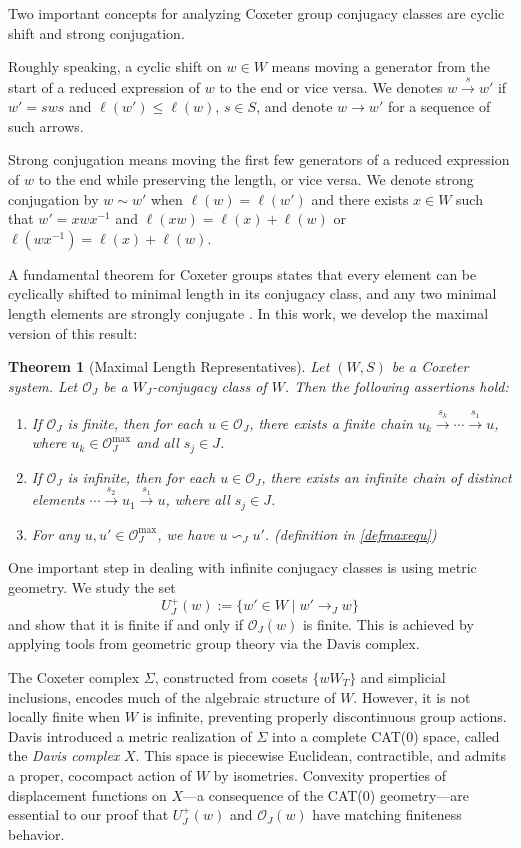 \documentclass[a4paper, reqno, 14pt]{amsart}
\def\co{\mathcal{O}}
\newtheorem{namedthm}{Theorem}
\newenvironment{thmA}[1]{%
  \renewcommand\thenamedthm{#1}%
  \begin{namedthm}
}{%
  \end{namedthm}
}
\theoremstyle{definition}
\theoremstyle{remark}
\numberwithin{equation}{section}
\numberwithin{thm}{section}
\begin{document}
Two important concepts for analyzing Coxeter group conjugacy classes are cyclic shift and strong conjugation.

Roughly speaking, a cyclic shift on $w \in W$ means moving a generator from the start of a reduced expression of $w$ to the end or vice versa. We denotes $w \xrightarrow{s} w'$ if $w'=s w s$ and $\ell(w') \le \ell(w)$, $s \in S$, and denote $w \rightarrow w'$ for a sequence of such arrows.

Strong conjugation means moving the first few generators of a reduced expression of $w$ to the end while preserving the length, or vice versa. We denote strong conjugation by $w \sim w'$ when $\ell(w)=\ell(w')$ and there exists $x \in W$ such that $w'=x w x^{-1}$ and $\ell(x w)=\ell(x)+\ell(w)$ or $\ell(w x^{-1})=\ell(x)+\ell(w)$. 

A fundamental theorem for Coxeter groups states that every element can be cyclically shifted to minimal length in its conjugacy class, and any two minimal length elements are strongly conjugate \cite{marquis2018cyclically}. In this work, we develop the maximal version of this result:

\begin{thmA}{B}[Maximal Length Representatives]
Let $(W,S)$ be a Coxeter system. Let $\co_{J}$ be a $W_J$-conjugacy class of $W$. Then the following assertions hold:
    \begin{enumerate}
         \item If $\co_{J}$ is finite, then for each $u \in \co_{J}$, there exists a finite chain $u_k\xrightarrow{s_k}\cdots\xrightarrow{s_1}u$, where $u_k \in \co^{\max}_J$ and all $s_j \in J$.
         \item If $\co_{J}$ is infinite, then for each $u \in \co_{J}$, there exists an infinite chain of distinct elements $\cdots\xrightarrow{s_2}u_1\xrightarrow{s_1}u$, where all $s_j \in J$.
         \item For any $u, u' \in \co^{\max}_{J}$, we have $u \backsim_{J} u'$. (definition in \ref{defmaxequ})
    \end{enumerate}
\end{thmA}

One important step in dealing with infinite conjugacy classes is using metric geometry. We study the set
\[
U^+_J(w) := \{ w' \in W \mid w' \to_J w \}
\]
and show that it is finite if and only if $\co_J(w)$ is finite. This is achieved by applying tools from geometric group theory via the Davis complex.

The Coxeter complex $\Sigma$, constructed from cosets $\{wW_T\}$ and simplicial inclusions, encodes much of the algebraic structure of $W$. However, it is not locally finite when $W$ is infinite, preventing properly discontinuous group actions. Davis \cite{davis1994buildings} introduced a metric realization of $\Sigma$ into a complete CAT(0) space, called the \emph{Davis complex} $X$. This space is piecewise Euclidean, contractible, and admits a proper, cocompact action of $W$ by isometries. Convexity properties of displacement functions on $X$—a consequence of the CAT(0) geometry—are essential to our proof that $U^+_J(w)$ and $\co_J(w)$ have matching finiteness behavior.
\end{document}
